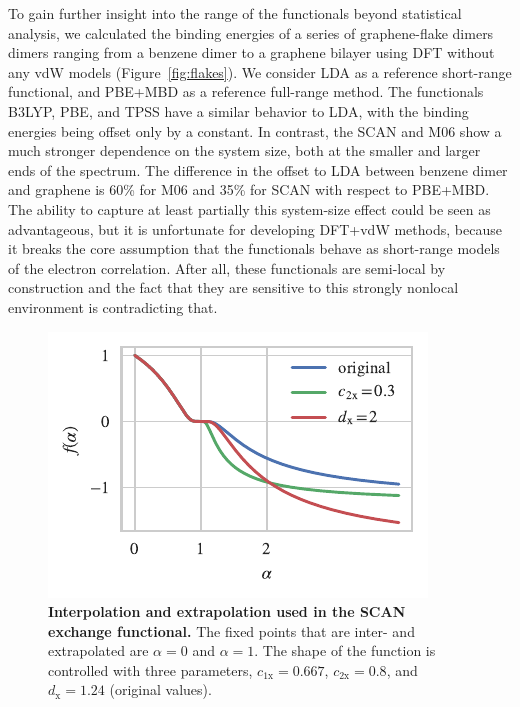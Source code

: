 To gain further insight into the range of the functionals beyond statistical analysis, we calculated the binding energies of a series of graphene-flake dimers dimers ranging from a benzene dimer to a graphene bilayer using DFT without any vdW models (Figure~\ref{fig:flakes}).
We consider LDA as a reference short-range functional, and PBE+MBD as a reference full-range method.
The functionals B3LYP, PBE, and TPSS have a similar behavior to LDA, with the binding energies being offset only by a constant.
In contrast, the SCAN and M06 show a much stronger dependence on the system size, both at the smaller and larger ends of the spectrum.
The difference in the offset to LDA between benzene dimer and graphene is 60\% for M06 and 35\% for SCAN with respect to PBE+MBD\@.
The ability to capture at least partially this system-size effect could be seen as advantageous, but it is unfortunate for developing DFT+vdW methods, because it breaks the core assumption that the functionals behave as short-range models of the electron correlation.
After all, these functionals are semi-local by construction and the fact that they are sensitive to this strongly nonlocal environment is contradicting that.

\begin{figure}
\centering
\includegraphics{../media/scan-interp}
\caption{\textbf{Interpolation and extrapolation used in the SCAN exchange functional.}
The fixed points that are inter- and extrapolated are $\alpha=0$ and $\alpha=1$.
The shape of the function is controlled with three parameters, $c_\mathrm{1x}=0.667$, $c_\mathrm{2x}=0.8$, and $d_\mathrm x=1.24$ (original values).
}\label{fig:scan-interp}
\end{figure}


